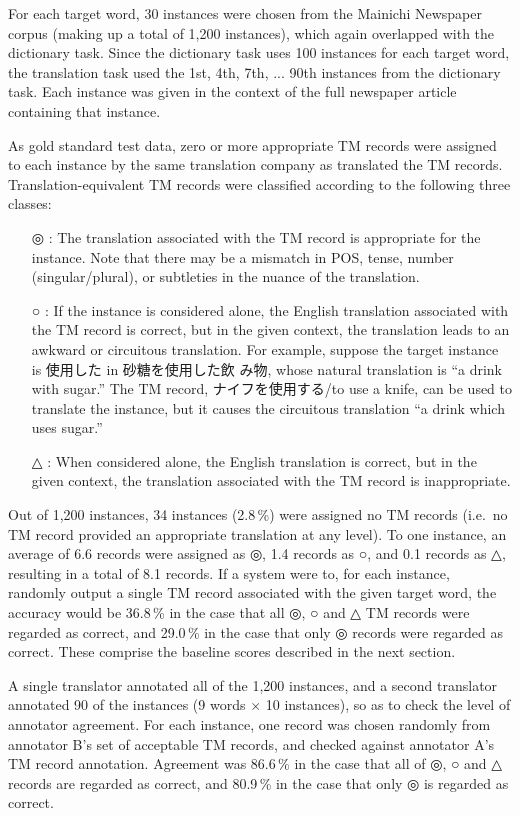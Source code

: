 For each target word, 30 instances were chosen from the Mainichi
Newspaper corpus (making up a total of 1,200 instances), which again
overlapped with the dictionary task.  Since the dictionary task uses 100
instances for each target word, the translation task used the 1st, 4th,
7th, ... 90th instances from the dictionary task.  Each instance was
given in the context of the full newspaper article containing  that instance.

As gold standard test data, zero or more appropriate TM records were
assigned to each instance by the same translation company as translated
the TM records. Translation-equivalent  TM records were classified
according to the following three classes:
\begin{itemize}
\item[◎] : The translation associated with the TM record is appropriate
  for the instance.  Note that there may be a mismatch in POS, tense,
  number (singular/plural), or subtleties in the nuance of the translation.
\item[○] : If the instance is considered alone, the English translation
  associated with the TM record is correct, but in the given context,
  the translation leads to an awkward or circuitous translation.  For
  example, suppose the target instance is 使用した in  砂糖を使用した飲
  み物, whose natural translation is ``a drink with sugar.'' The TM
  record, ナイフを使用する/to use a knife, can be used to translate the
  instance, but it causes the circuitous translation ``a drink which
  uses sugar.''
\item[△] : When considered alone, the English translation is correct,
  but in the given context, the translation associated with the TM
  record is inappropriate.
\end{itemize}

Out of 1,200 instances, 34 instances (2.8\,\%) were assigned no TM records
(i.e.\ no TM record provided an appropriate translation at any level).
To one instance, an average of 6.6 records were assigned as ◎, 1.4
records as ○, and 0.1 records as △, resulting in a total of 8.1
records.  If a system were to, for each instance, randomly output a
single TM record associated with the given target word, the accuracy
would be 36.8\,\% in the case that all ◎, ○ and △ TM records were
regarded as correct, and 29.0\,\% in the case that only ◎ records were
regarded as correct. These comprise the baseline scores described in the
next section.

A single translator annotated all of the 1,200 instances, and a second
translator annotated 90 of the instances (9 words $\times$ 10
instances), so as to check the level of annotator agreement.  For each
instance, one record was chosen randomly from annotator B's set of
acceptable TM records, and checked against annotator A's TM record
annotation.  Agreement was 86.6\,\% in the case that all of ◎,  ○  and 
△  records are regarded as correct, and 80.9\,\% in the case that only 
◎ is regarded as correct.

